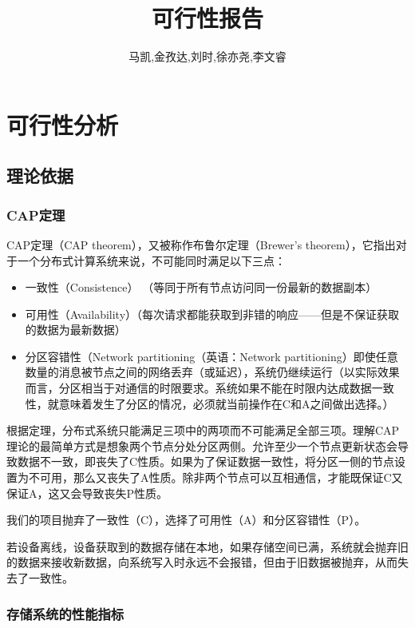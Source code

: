 \documentclass{ctexart}
\begin{document}
\title{可行性报告}
\author{马凯,金孜达,刘时,徐亦尧,李文睿}
\setcounter{tocdepth}{2}
\maketitle
\tableofcontents
\newpage

\section{可行性分析}
\subsection{理论依据}
\subsubsection{CAP定理}
CAP定理（CAP theorem），又被称作布鲁尔定理（Brewer's theorem），它指出对于一个分布式计算系统来说，不可能同时满足以下三点：
\begin{itemize}
    \item 一致性（Consistence） （等同于所有节点访问同一份最新的数据副本）
    \item 可用性（Availability）（每次请求都能获取到非错的响应——但是不保证获取的数据为最新数据）
    \item 分区容错性（Network partitioning（英语：Network partitioning）即使任意数量的消息被节点之间的网络丢弃（或延迟），系统仍继续运行（以实际效果而言，分区相当于对通信的时限要求。系统如果不能在时限内达成数据一致性，就意味着发生了分区的情况，必须就当前操作在C和A之间做出选择。）
\end{itemize}

根据定理，分布式系统只能满足三项中的两项而不可能满足全部三项。理解CAP理论的最简单方式是想象两个节点分处分区两侧。允许至少一个节点更新状态会导致数据不一致，即丧失了C性质。如果为了保证数据一致性，将分区一侧的节点设置为不可用，那么又丧失了A性质。除非两个节点可以互相通信，才能既保证C又保证A，这又会导致丧失P性质。

我们的项目抛弃了一致性（C），选择了可用性（A）和分区容错性（P）。

若设备离线，设备获取到的数据存储在本地，如果存储空间已满，系统就会抛弃旧的数据来接收新数据，向系统写入时永远不会报错，但由于旧数据被抛弃，从而失去了一致性。

\subsubsection{存储系统的性能指标}
\end{document}
